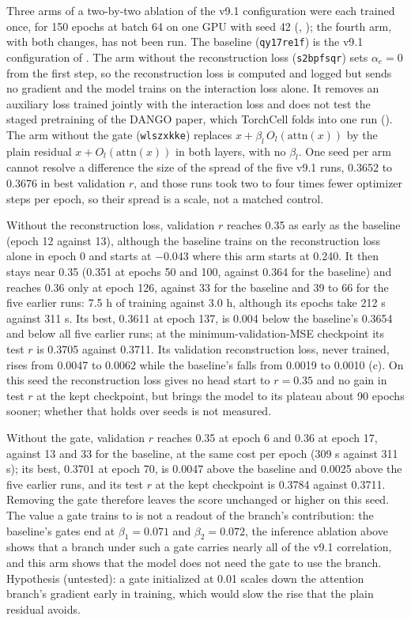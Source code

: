  Three arms of a two-by-two
ablation of the v9.1 configuration were each trained once, for 150 epochs at batch 64 on one
GPU with seed 42 (, ); the fourth
arm, with both changes, has not been run. The baseline (\texttt{qy17re1f}) is the v9.1
configuration of . The arm without the reconstruction loss
(\texttt{s2bpfsqr}) sets $\alpha_e=0$ from the first step, so the reconstruction loss is
computed and logged but sends no gradient and the model trains on the interaction loss alone.
It removes an auxiliary loss trained jointly with the interaction loss and does not test the
staged pretraining of the DANGO paper, which TorchCell folds into one run
(). The arm without the gate (\texttt{wlszxkke}) replaces
$x+\beta_l\,O_l(\mathrm{attn}(x))$ by the plain residual $x+O_l(\mathrm{attn}(x))$ in both
layers, with no $\beta_l$. One seed per arm cannot resolve a difference the size of the spread
of the five v9.1 runs, 0.3652 to 0.3676 in best validation $r$, and those runs took two to four
times fewer optimizer steps per epoch, so their spread is a scale, not a matched control.

Without the reconstruction loss, validation $r$ reaches 0.35 as early as the baseline (epoch 12
against 13), although the baseline trains on the reconstruction loss alone in epoch 0 and
starts at $-0.043$ where this arm starts at 0.240. It then stays near 0.35 (0.351 at epochs 50
and 100, against 0.364 for the baseline) and reaches 0.36 only at epoch 126, against 33 for the
baseline and 39 to 66 for the five earlier runs: 7.5 h of training against 3.0 h, although its
epochs take 212 s against 311 s. Its best, 0.3611 at epoch 137, is 0.004 below the baseline's
0.3654 and below all five earlier runs; at the minimum-validation-MSE checkpoint its test $r$ is
0.3705 against 0.3711. Its validation reconstruction loss, never trained, rises from 0.0047 to
0.0062 while the baseline's falls from 0.0019 to 0.0010 (c). On
this seed the reconstruction loss gives no head start to $r=0.35$ and no gain in test $r$ at the
kept checkpoint, but brings the model to its plateau about 90 epochs sooner; whether that holds
over seeds is not measured.

Without the gate, validation $r$ reaches 0.35 at epoch 6 and 0.36 at
epoch 17, against 13 and 33 for the baseline, at the same cost per epoch (309 s against 311 s);
its best, 0.3701 at epoch 70, is 0.0047 above the baseline and 0.0025 above the five earlier
runs, and its test $r$ at the kept checkpoint is 0.3784 against 0.3711. Removing the gate
therefore leaves the score unchanged or higher on this seed. The value a gate trains to is not a
readout of the branch's contribution: the baseline's gates end at $\beta_1=0.071$ and
$\beta_2=0.072$, the inference ablation above shows that a branch under such a gate carries
nearly all of the v9.1 correlation, and this arm shows that the model does not need the gate to
use the branch. Hypothesis (untested): a gate initialized at 0.01 scales down the attention
branch's gradient early in training, which would slow the rise that the plain residual avoids.

